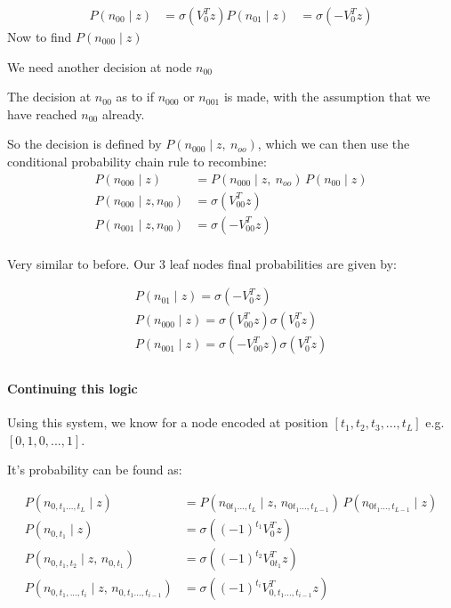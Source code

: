 \documentclass[parskip]{komatufte}
\begin{document}
\begin{align}
P(n_{00}\mid z)&=\sigma(V_{0}^{T}z)
P(n_{01}\mid z)&=\sigma(-V_{0}^{T}z)
\end{align}
Now to find $P(n_{000}\mid z)$

We need another decision at node $n_{00}$

The decision at $n_{00}$ as to if $n_{000}$ or $n_{001}$ is made,
with the assumption that we have reached $n_{00}$ already.

So the decision is defined by $P(n_{000}\mid z,\:n_{oo})$,
which we can then use the conditional probability chain rule to recombine:
\begin{align}
P(n_{000}\mid z)&=P(n_{000}\mid z,\:n_{oo})\,P(n_{00}\mid z) \\
P(n_{000}\mid z,n_{00})&=\sigma(V_{00}^{T}z) \\
P(n_{001}\mid z,n_{00})&=\sigma(-V_{00}^{T}z) \\
\end{align}

Very similar to before.
Our 3 leaf nodes final probabilities are given by:

\begin{align}
P(n_{01}\mid z)=\sigma(-V_{0}^{T}z) \\
P(n_{000}\mid z)=\sigma(V_{00}^{T}z)\sigma(V_{0}^{T}z) \\
P(n_{001}\mid z)=\sigma(-V_{00}^{T}z)\sigma(V_{0}^{T}z) \\
\end{align}

\paragraph{Continuing this logic}

Using this system,
we know for a node encoded at position $[t_{1},t_{2},t_{3},...,t_{L}]$
e.g. $[0,1,0,...,1]$.

It's probability can be found as: 

\begin{align}
P(n_{0,t_{1}...,t_{L}}\mid z) &= P(n_{0t_{1}...,t_{L}}\mid z,\,n_{0t_{1}...,t_{L-1}})\,P(n_{0t_{1}...,t_{L-1}}\mid z)\\
%
P(n_{0,t_{1}}\mid z)&=\sigma\left((-1)^{t_{1}}V_{0}^{T}z\right)\\
%
P(n_{0,t_{1},t_{2}}\mid z,\,n_{0,t_{1}})&=\sigma\left((-1)^{t_{2}}V_{0t_{1}}^{T}z\right)\\
%
P(n_{0,t_{1},...,t_{i}}\mid z,\,n_{0,t_{1}...,t_{i-1}})&=\sigma\left((-1)^{t_{i}}V_{0,t_{1}...,t_{i-1}}^{T}z\right)
\end{align}
\end{document}
